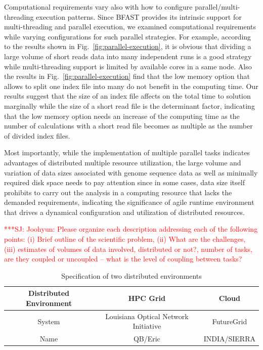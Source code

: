 \documentclass[12pt]{article}
\newcommand{\jhanote}[1]{ {\textcolor{red}     {***SJ: #1}}}
\newcommand{\jhanote}[1]{}
\begin{document}
Computational requirements vary also with how to configure parallel/multi-threading execution patterns.  Since BFAST provides its intrinsic support for multi-threading and parallel execution, we examined computational requirements while varying configurations for such parallel strategies.  For example, according to the results shown in Fig.~\ref{fig:parallel-execution}, it is obvious that dividing a large volume of short reads data into many independent runs is a good strategy while multi-threading support is limited by available cores in a same node.  Also the results in Fig.~\ref{fig:parallel-execution} find that the low memory option that allows to split one index file into many do not benefit in the computing time. Our results suggest that the size of an index file affects on the total time to solution marginally while the size of a short read file is the determinant factor, indicating that the low memory option needs an increase of the computing time as the number of calculations with a short read file becomes as multiple as the number of divided index files.   

Most importantly, while the implementation of multiple parallel tasks indicates advantages of distributed multiple resource utilization, the large volume and variation of data sizes associated with genome sequence data as well as minimally required disk space needs to pay attention since in some cases, data size itself prohibits to carry out the analysis in a computing resource that lacks the demanded requirements, indicating the significance of agile runtime environment that drives a dynamical configuration and utilization of distributed resources. 




\jhanote{Joohyun: Please organize each description addressing each of
  the following points: (i) Brief outline of the scientific problem,
  (ii) What are the challenges, (iii) estimates of volumes of data
  involved, distributed or not?, number of tasks, are they coupled or
  uncoupled -- what is the level of coupling between tasks?}


 \begin{table}
 \begin{tabular}{|c|cc|} 
 \hline 
Distributed Environment &  HPC Grid &  Cloud \\ \hline
System  &  Louisiana Optical Network Initiative & FutureGrid \\
Name &  QB/Eric   &  INDIA/SIERRA \\
 \hline
 \end{tabular}
\caption{Specification of two distributed environments}
\label{table:two-systems} 
\end{table}
 
\end{document}
